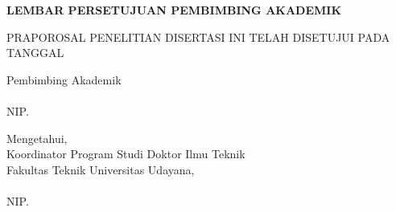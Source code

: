 
\newpage

\newcommand{\smartsignature}[2]{%
    \setbox0=\hbox{#1}%
    \ifdim\wd0>0.47\textwidth
        {\small #1\\[0.3em]#2}%
    \else
        {#1\\[0.3em]#2}%
    \fi
}

\begin{center}
    \begin{onehalfspace}
        \textbf{\large LEMBAR PERSETUJUAN PEMBIMBING AKADEMIK}
    \end{onehalfspace}
\end{center}

\begin{center}
    \begin{onehalfspace}
        \large \MakeUppercase {PRAPOROSAL PENELITIAN DISERTASI INI TELAH DISETUJUI PADA TANGGAL \tglpersetujuan}
    \end{onehalfspace}
\end{center}

\begin{center}
	\begin{minipage}[t]{0.85\textwidth}
		\centering
		
		Pembimbing Akademik \\[2.5cm]
		
		\dosenPA\\
		NIP. \NIPdosenPA
	\end{minipage}    
\end{center}
\vspace{1.0cm}
\begin{center}
	\begin{minipage}[t]{0.98\textwidth}
		\centering
		Mengetahui,\\
		Koordinator Program Studi Doktor Ilmu Teknik\\
		Fakultas Teknik Universitas Udayana,\\[2.5cm]
		
		\koorprodi\\
		NIP. \NIPkoorprodi
	\end{minipage}%
\end{center}



